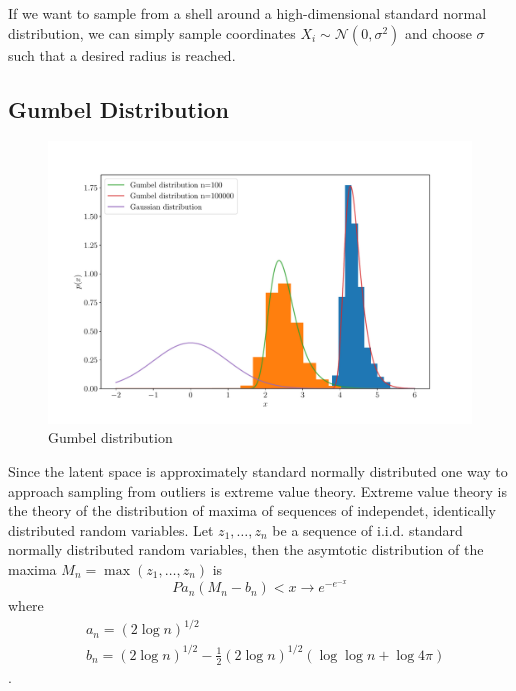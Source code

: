 If we want to sample from a shell around a high-dimensional standard normal
distribution, we can simply sample coordinates $X_i \sim \mathcal{N}(0,
\sigma^2)$ and choose $\sigma$ such that a desired radius is reached.


\subsection{Gumbel Distribution}%
\label{sub:gumbel_distribution}

\begin{figure}[htpb]
    \centering
    \includegraphics[width=0.8\linewidth]{figures/gumbel_uni.pdf}
    \caption{Gumbel distribution}%
    \label{fig:gumbel_uni}
\end{figure}

Since the latent space is approximately standard normally distributed one way
to approach sampling from outliers is extreme value theory. Extreme value
theory is the theory of the distribution of maxima of sequences of independet,
identically distributed random variables. Let $z_1, \dots, z_n$ be a sequence
of i.i.d. standard normally distributed random variables, then the asymtotic
distribution of the maxima $M_n = \max (z_1, \dots, z_n)$ is
\begin{equation}%
    \label{eq:gumbel_distribution}
    P{a_n ( M_n - b_n ) < x} \rightarrow e^{-e^{-x}}
\end{equation}
where
\begin{equation}
    \begin{aligned}%
        \label{eq:gumbel_params}
        &a_n = (2 \log n )^{1/2} \\
        &b_n = (2 \log n )^{1/2} - \frac{1}{2} (2 \log n )^{1/2} (\log \log
        n + \log 4 \pi)
    \end{aligned}
\end{equation}
\citep{leadbetterAsymptoticDistributionsExtremes1983}.

